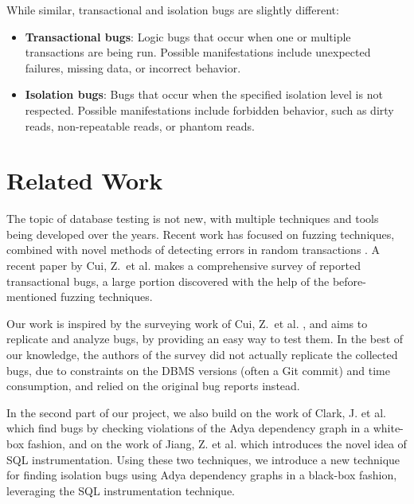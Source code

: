 While similar, transactional and isolation bugs are slightly different:
\begin{itemize}
    \item \textbf{Transactional bugs}: Logic bugs that occur when one or multiple transactions are being run. Possible manifestations include unexpected failures, missing data, or incorrect behavior.
    \item \textbf{Isolation bugs}: Bugs that occur when the specified isolation level is not respected. Possible manifestations include forbidden behavior, such as dirty reads, non-repeatable reads, or phantom reads.
\end{itemize}

\section{Related Work}

The topic of database testing is not new, with multiple techniques and tools being developed over the years. Recent work has focused on fuzzing techniques, combined with novel methods of detecting errors in random transactions \cite{jiang2023detecting, cui2022differentially_ASE2022, dou2023detecting_ICSE2023, clark2024validating}. A recent paper by Cui, Z.\ et al. \cite{cui2024understanding_ICSE2024} makes a comprehensive survey of reported transactional bugs, a large portion discovered with the help of the before-mentioned fuzzing techniques.

Our work is inspired by the surveying work of Cui, Z.\ et al. \cite{cui2024understanding_ICSE2024}, and aims to replicate and analyze bugs, by providing an easy way to test them. In the best of our knowledge, the authors of the survey did not actually replicate the collected bugs, due to constraints on the DBMS versions (often a Git commit) and time consumption, and relied on the original bug reports instead.

In the second part of our project, we also build on the work of Clark, J. et al. \cite{clark2024validating} which find bugs by checking violations of the Adya dependency graph \cite{adya1999weak} in a white-box fashion, and on the work of Jiang, Z. et al. \cite{jiang2023detecting} which introduces the novel idea of SQL instrumentation. Using these two techniques, we introduce a new technique for finding isolation bugs using Adya dependency graphs in a black-box fashion, leveraging the SQL instrumentation technique.



